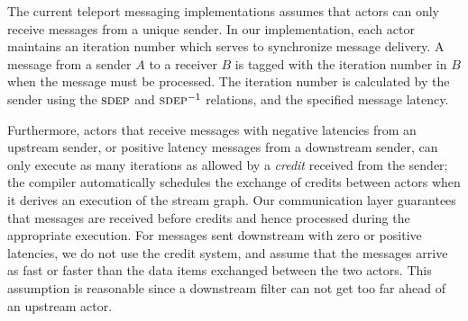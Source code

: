 The current teleport messaging implementations assumes that actors
can only receive messages from a unique sender.
In our implementation, each actor maintains an iteration number which
serves to synchronize message delivery. A message from a sender $A$ to
a receiver $B$ is tagged with the iteration number in $B$ when the
message must be processed. The iteration number is calculated by the
sender using the $\textsc{sdep}$ and $\textsc{sdep}^{-1}$ relations, and the specified
message latency.

Furthermore, actors that receive messages with negative latencies from
an upstream sender, or positive latency messages from a downstream sender, 
can only execute as many iterations as allowed by a
{\it credit} received from the sender; the compiler automatically
schedules the exchange  of credits between actors when it derives an
execution of the stream graph. Our communication layer guarantees that
messages are received before credits and hence processed during the
appropriate execution.
For messages sent downstream with zero or positive latencies, we
do not use the credit system, and assume that the messages arrive as fast or
faster than the data items exchanged between the two actors. This
assumption is reasonable since a downstream filter can not get too far
ahead of an upstream actor.

                                                                                                     

